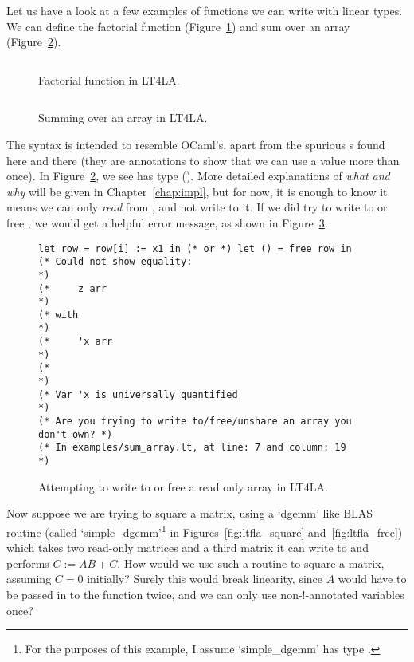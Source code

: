 Let us have a look at a few examples of functions we can write with linear
types.  We can define the factorial function
(Figure~\ref{fig:ltfla_factorial}) and sum over an array
(Figure~\ref{fig:ltfla_sumarray}).

\begin{figure}[tp]
    \centering
    \inputminted[fontsize=\small]{ocaml}{../../examples/factorial.lt}
    \caption{Factorial function in LT4LA.}\label{fig:ltfla_factorial}
\end{figure}

\begin{figure}[tp]
    \centering
    \inputminted[fontsize=\small]{ocaml}{../../examples/sum_array.lt}
    \caption{Summing over an array in LT4LA.}\label{fig:ltfla_sumarray}
\end{figure}

The syntax is intended to resemble OCaml's, apart from the spurious
s found here and there (they are annotations to show that we can
use a value more than once). In Figure~\ref{fig:ltfla_sumarray}, we see
 has type (). More detailed explanations of
\emph{what and why} will be given in Chapter~\ref{chap:impl}, but for now, it
is enough to know it means we can only \emph{read} from , and not
write to it. If we did try to write to or free , we would get a
helpful error message, as shown in Figure~\ref{fig:ltfla_univ}.

\begin{figure}[tp]
    \centering
    \begin{verbatim}
let row = row[i] := x1 in (* or *) let () = free row in
(* Could not show equality:                                        *)
(*     z arr                                                       *)
(* with                                                            *)
(*     'x arr                                                      *)
(*                                                                 *)
(* Var 'x is universally quantified                                *)
(* Are you trying to write to/free/unshare an array you don't own? *)
(* In examples/sum_array.lt, at line: 7 and column: 19        *)
    \end{verbatim}
    \caption{Attempting to write to or free a read only array in
    LT4LA.}\label{fig:ltfla_univ}
\end{figure}

Now suppose we are trying to square a matrix, using a `dgemm' like BLAS
routine (called `simple\_dgemm'\footnote{For the purposes of this example, I
assume `simple\_dgemm' has type .} in Figures~\ref{fig:ltfla_square}
and~\ref{fig:ltfla_free}) which takes two read-only matrices and a third matrix
it can write to and performs $C := AB + C$. How would we use such a routine to
square a matrix, assuming $C=0$ initially?  Surely this would break linearity,
since $A$ would have to be passed in to the function twice, and we can only 
use non-!-annotated variables once?

